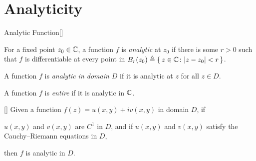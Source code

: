 \documentclass[../complex_variables_1.tex]{subfiles}
\begin{document}
\section{Analyticity}

\begin{Definition}{Analytic Function}[]
\begin{itemize}
    \ii
    For a fixed point \(z_0 \in \CC\),
    a function \(f\) is \emph{analytic} at \(z_0\)
    if there is some \(r > 0\) such that
    \(f\) is differentiable at every point in
    \(B_r(z_0) \triangleq \{\,z \in \CC \colon |z - z_0| < r\,\}\).

    \ii
    A function \(f\) is \emph{analytic in domain \(D\)}
    if it is analytic at \(z\) for all \(z \in D\).

    \ii
    A function \(f\) is \emph{entire} if it is analytic in \(\CC\).
\end{itemize}
\end{Definition}

\begin{Theorem}{}[]
    Given a function \(f(z) = u(x,y)+iv(x,y)\) in domain \(D\), if
    \begin{enumerate}[label=(\arabic*)]
        \ii \(u(x, y)\) and \(v(x, y)\) are \(C^1\) in \(D\), and if
        \ii \(u(x,y)\) and \(v(x,y)\) satisfy the Cauchy--Riemann equations in \(D\),
    \end{enumerate}
    then \(f\) is analytic in \(D\).
\end{Theorem}
\end{document}
